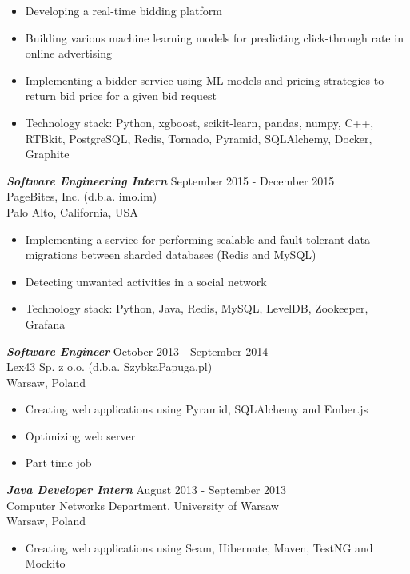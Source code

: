 \documentclass[margin, 10pt]{res} %
\begin{document}
\begin{resume}
\begin{itemize} \itemsep -2pt %
\item Developing a real-time bidding platform
\item Building various machine learning models for predicting click-through rate in online advertising
\item Implementing a bidder service using ML models and pricing strategies to return bid price for a given bid request
\item Technology stack: Python, xgboost, scikit-learn, pandas, numpy, C++, RTBkit, PostgreSQL, Redis, Tornado, Pyramid, SQLAlchemy, Docker, Graphite
\end{itemize}

{\sl \bf Software Engineering Intern} \hfill September 2015 - December 2015 \\
PageBites, Inc. (d.b.a. imo.im) \\
Palo Alto, California, USA

\begin{itemize} \itemsep -2pt %
\item Implementing a service for performing scalable and fault-tolerant data migrations between sharded databases (Redis and MySQL) 
\item Detecting unwanted activities in a social network
\item Technology stack: Python, Java, Redis, MySQL, LevelDB, Zookeeper, Grafana
\end{itemize}


{\sl \bf Software Engineer} \hfill October 2013 - September 2014 \\
Lex43 Sp. z o.o. (d.b.a. SzybkaPapuga.pl) \\
Warsaw, Poland

\begin{itemize} \itemsep -2pt %
\item Creating web applications using Pyramid, SQLAlchemy and Ember.js
\item Optimizing web server 
\item Part-time job
\end{itemize}
 
{\sl \bf Java Developer Intern } \hfill August 2013 - September 2013 \\
Computer Networks Department, University of Warsaw \\
Warsaw, Poland
\begin{itemize} 
\item Creating web applications using Seam, Hibernate, Maven, TestNG and Mockito
\end{itemize}


\end{resume}
\end{document}
